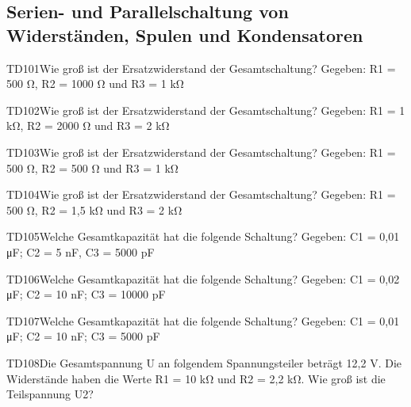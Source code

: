 \subsection{Serien- und Parallelschaltung von Widerständen, Spulen und Kondensatoren}

\begin{question}{TD101}{Wie groß ist der Ersatzwiderstand der Gesamtschaltung? Gegeben: R1 = 500 Ω,  R2 = 1000 Ω und R3 = 1 kΩ}
\end{question}

\begin{question}{TD102}{Wie groß ist der Ersatzwiderstand der Gesamtschaltung? Gegeben: R1 = 1 kΩ,  R2 = 2000 Ω und R3 = 2 kΩ}
\end{question}

\begin{question}{TD103}{Wie groß ist der Ersatzwiderstand der Gesamtschaltung? Gegeben: R1 = 500 Ω,  R2 = 500 Ω und R3 = 1 kΩ}
\end{question}

\begin{question}{TD104}{Wie groß ist der Ersatzwiderstand der Gesamtschaltung? Gegeben: R1 = 500 Ω,  R2 = 1,5 kΩ und R3 = 2 kΩ}
\end{question}

\begin{question}{TD105}{Welche Gesamtkapazität hat die folgende Schaltung? Gegeben: C1 = 0,01 μF;  C2 = 5 nF,  C3 = 5000 pF}
\end{question}

\begin{question}{TD106}{Welche Gesamtkapazität hat die folgende Schaltung? Gegeben: C1 = 0,02 μF; C2 = 10 nF; C3 = 10000 pF}
\end{question}

\begin{question}{TD107}{Welche Gesamtkapazität hat die folgende Schaltung? Gegeben: C1 = 0,01 μF; C2 = 10 nF; C3 = 5000 pF}
\end{question}

\begin{question}{TD108}{Die Gesamtspannung U an folgendem Spannungsteiler beträgt 12,2 V. Die Widerstände haben die Werte R1 = 10 kΩ und R2 = 2,2 kΩ. Wie groß ist die Teilspannung U2?}
\end{question}

